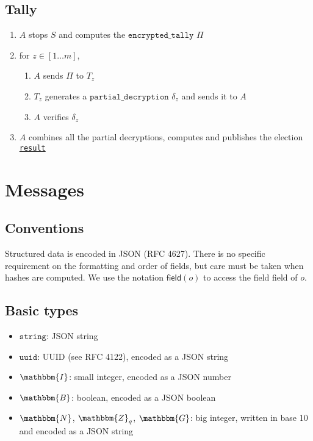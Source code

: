 \documentclass[a4paper]{article}
\newcommand{\G}{\mathbbm{G}}
\newcommand{\Z}{\mathbbm{Z}}
\newcommand{\N}{\mathbbm{N}}
\newcommand{\I}{\mathbbm{I}}
\newcommand{\B}{\mathbbm{B}}
\newcommand{\jstring}{\texttt{string}}
\newcommand{\uuid}{\texttt{uuid}}
\newcommand{\etally}{\texttt{encrypted\_tally}}
\newcommand{\pdecryption}{\texttt{partial\_decryption}}
\newcommand{\result}{\texttt{result}}
\begin{document}
\subsection{Tally}

\begin{enumerate}
\item $A$ stops $S$ and computes the \hyperref[tally]{$\etally$} $\Pi$
\item for $z\in[1\dots m]$,
  \begin{enumerate}
  \item $A$ sends $\Pi$ to $T_z$
  \item $T_z$ generates a \hyperref[tally]{$\pdecryption$} $\delta_z$
    and sends it to $A$
  \item $A$ verifies $\delta_z$
  \end{enumerate}
\item $A$ combines all the partial decryptions, computes and publishes
  the election \hyperref[election-result]{\result}
\end{enumerate}

\section{Messages}
\label{messages}

\subsection{Conventions}

Structured data is encoded in JSON (RFC 4627). There is no specific
requirement on the formatting and order of fields, but care must be
taken when hashes are computed. We use the notation
$\textsf{field}(o)$ to access the field \textsf{field} of $o$.

\subsection{Basic types}
\label{basic-types}

\begin{itemize}
\item $\jstring$: JSON string
\item $\uuid$: UUID (see RFC 4122), encoded as a JSON string
\item $\I$: small integer, encoded as a JSON number
\item $\B$: boolean, encoded as a JSON boolean
\item $\N$, $\Z_q$, $\G$: big integer, written in base 10 and encoded as a
  JSON string
\end{itemize}
\end{document}
